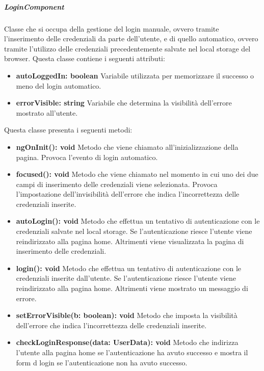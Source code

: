 \subparagraph{LoginComponent}
Classe che si occupa della gestione del login manuale, ovvero tramite l'inserimento delle credenziali da parte dell'utente, e di quello automatico, ovvero tramite l'utilizzo delle credenziali precedentemente salvate nel local storage del browser. \newline
Questa classe contiene i seguenti attributi:
\begin{itemize}
	\item \textbf{autoLoggedIn: boolean} \newline
	Variabile utilizzata per memorizzare il successo o meno del login automatico.
	\item \textbf{errorVisible: string} \newline
	Variabile che determina la visibilità dell'errore mostrato all'utente.
\end{itemize}
Questa classe presenta i seguenti metodi:
\begin{itemize}
	\item \textbf{ngOnInit(): void} \newline
	Metodo che viene chiamato all'inizializzazione della pagina. Provoca l'evento di login automatico.
	\item \textbf{focused(): void} \newline
	Metodo che viene chiamato nel momento in cui uno dei due campi di inserimento delle credenziali viene selezionata. Provoca l'impostazione dell'invisibilità dell'errore che indica l'incorrettezza delle credenziali inserite.
	\item \textbf{autoLogin(): void} \newline
	Metodo che effettua un tentativo di autenticazione con le credenziali salvate nel local storage. Se l'autenticazione riesce l'utente viene reindirizzato alla pagina home. Altrimenti viene visualizzata la pagina di inserimento delle credenziali.
	\item \textbf{login(): void} \newline
	Metodo che effettua un tentativo di autenticazione con le credenziali inserite dall'utente. Se l'autenticazione riesce l'utente viene reindirizzato alla pagina home. Altrimenti viene mostrato un messaggio di errore.
	\item \textbf{setErrorVisible(b: boolean): void} \newline
	Metodo che imposta la visibilità dell'errore che indica l'incorrettezza delle credenziali inserite.
	\item \textbf{checkLoginResponse(data: UserData): void} \newline
	Metodo che indirizza l'utente alla pagina home se l'autenticazione ha avuto successo e mostra il form d login se l'autenticazione non ha avuto successo.
\end{itemize}
